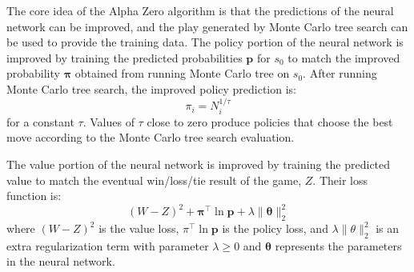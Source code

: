 \documentclass[10pt]{article}
\newcommand{\transpose}{\top}
\newcommand{\vect}[1]{\boldsymbol{\mathbf{#1}}}
\begin{document}
\begin{figure}[H]
\end{figure}

The core idea of the Alpha Zero algorithm is that the predictions of the neural network can be improved, and the play generated by Monte Carlo tree search can be used to provide the training data.
The policy portion of the neural network is improved by training the predicted probabilities $\vect p$ for $s_0$ to match the improved probability ${\vect \pi}$ obtained from running Monte Carlo tree on $s_0$.
After running Monte Carlo tree search, the improved policy prediction is:
\[
\pi_i = N_i^{1/\tau}
\]
for a constant $\tau$.
Values of $\tau$ close to zero produce policies that choose the best move according to the Monte Carlo tree search evaluation.

The value portion of the neural network is improved by training the predicted value to match the eventual win/loss/tie result of the game, $Z$.
Their loss function is:
\[
(W - Z)^2 + {\vect \pi}^\transpose \ln \vect p + \lambda \|\vect \theta\|_2^2
\]
where $(W - Z)^2$ is the value loss, $\pi^\transpose \ln \vect p$ is the policy loss, and $\lambda \|\theta\|_2^2$ is an extra regularization term with parameter $\lambda \geq 0$ and $\vect \theta$ represents the parameters in the neural network.
\end{document}
